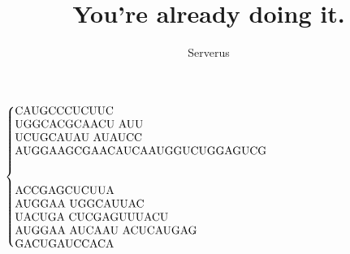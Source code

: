 \documentclass[12pt]{article}
\title{You're already doing it.}
\author{Serverus}
\date{}
\begin{document}
\maketitle
\thispagestyle{empty}
\begin{center}
$\begin{cases}
\parbox{\textwidth}{CAUGCCCUCUUC\\
UGGCACGCAACU
AUU \\
UCUGCAUAU 
AUAUCC \\
AUGGAAGCGAACAUCAAUGGUCUGGAGUCG}\\
\ \\
\ \\
\parbox{\textwidth}{ACCGAGCUCUUA \\
AUGGAA 
UGGCAUUAC \\
UACUGA 
CUCGAGUUUACU\\ 
AUGGAA 
AUCAAU 
ACUCAUGAG \\
GACUGAUCCACA}
\end{cases}
$
\end{center}
\end{document}
